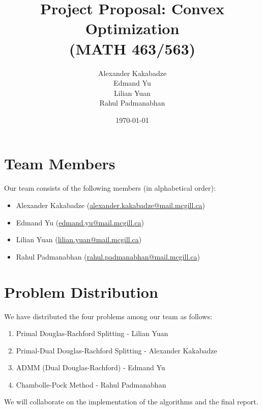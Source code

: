 \documentclass[12pt]{article}
\title{Project Proposal: Convex Optimization \\(MATH 463/563)}
\author{
    Alexander Kakabadze\\
    Edmand Yu\\
    Lilian Yuan\\
    Rahul Padmanabhan
}
\date{\today}
\begin{document}
\maketitle

\section{Team Members}
Our team consists of the following members (in alphabetical order):
\begin{itemize}
    \item Alexander Kakabadze (\href{mailto:alexander.kakabadze@mail.mcgill.ca}{alexander.kakabadze@mail.mcgill.ca})
    \item Edmand Yu (\href{mailto:edmand.yu@mail.mcgill.ca}{edmand.yu@mail.mcgill.ca})
    \item Lilian Yuan (\href{mailto:lilian.yuan@mail.mcgill.ca}{lilian.yuan@mail.mcgill.ca})
    \item Rahul Padmanabhan (\href{mailto:rahul.padmanabhan@mail.mcgill.ca}{rahul.padmanabhan@mail.mcgill.ca})
\end{itemize}

\section{Problem Distribution}
We have distributed the four problems among our team as follows:
\begin{enumerate}
    \item Primal Douglas-Rachford Splitting - Lilian Yuan
    \item Primal-Dual Douglas-Rachford Splitting - Alexander Kakabadze
    \item ADMM (Dual Douglas-Rachford) - Edmand Yu
    \item Chambolle-Pock Method - Rahul Padmanabhan
\end{enumerate}
\medskip
We will collaborate on the implementation of the algorithms and the final report.
\end{document}
